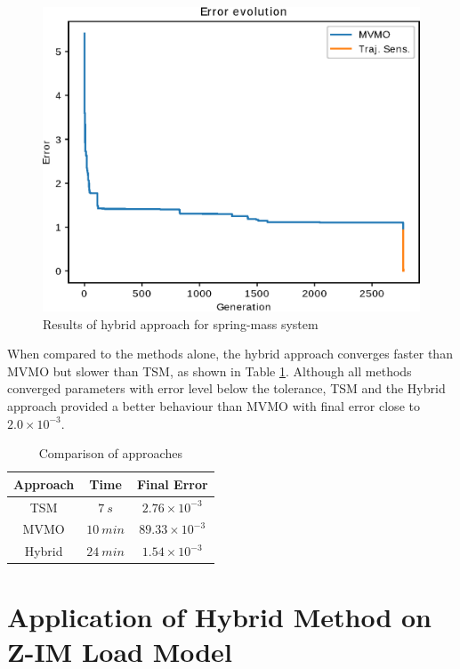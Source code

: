 \begin{figure}[h]
	\caption{Results of hybrid approach for spring-mass system}
	\begin{center}
		\includegraphics[scale=0.7]{Images/Hybrid_conv.eps}
	\end{center}
	\label{fig: Hybrid_conv}
\end{figure}

When compared to the methods alone, the hybrid approach converges faster than MVMO but slower than TSM, as shown in Table \ref{tab: SM}. Although all methods converged parameters with error level below the tolerance, TSM and the Hybrid approach provided a better behaviour than MVMO with final error close to $2.0\times 10^{-3}$.

\begin{table}[h]
	\caption{Comparison of approaches}
	\begin{center}
	\begin{tabular}{c|c|c}
		Approach & Time & Final Error \\
		\hline
		TSM  & $7 \ s$  & $2.76\times 10^{-3}$ \\
		MVMO  & $10 \ min$  & $89.33\times 10^{-3}$\\
		Hybrid  & $24 \ min$  & $1.54\times 10^{-3}$
	\end{tabular}
	\end{center}
	\label{tab: SM}
\end{table}

\section{Application of Hybrid Method on Z-IM Load Model}

